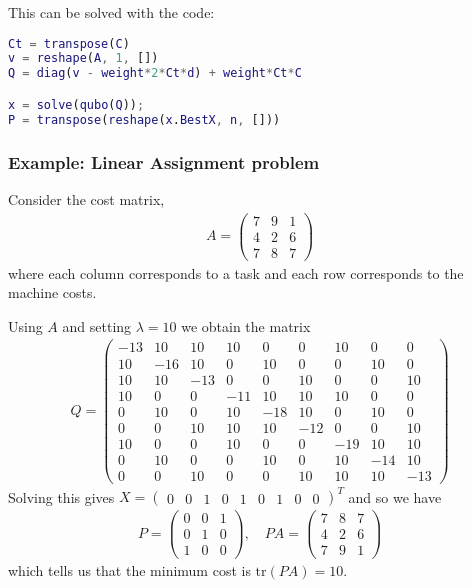 \documentclass{article}
\begin{document}
\noindent This can be solved with the code:
\begin{mdframed}[backgroundcolor=gray!12]
\begin{lstlisting}[language=MATLAB]
Ct = transpose(C)
v = reshape(A, 1, [])
Q = diag(v - weight*2*Ct*d) + weight*Ct*C

x = solve(qubo(Q));
P = transpose(reshape(x.BestX, n, []))
\end{lstlisting}
\end{mdframed}

\subsubsection{Example: Linear Assignment problem}

Consider the cost matrix, \begin{align*}
    A = \begin{pmatrix}
        7 & 9 & 1\\
        4 & 2 & 6\\
        7 & 8 & 7
    \end{pmatrix}
\end{align*}
where each column corresponds to a task and each row corresponds to the machine costs.

\noindent Using \(A\) and setting \(\lambda = 10\) we obtain the matrix
\begin{align*}
    Q = \begin{pmatrix}
        -13 & 10 & 10 & 10 & 0 & 0 & 10 & 0 & 0 \\
        10 & -16 & 10 & 0 & 10 & 0 & 0 & 10 & 0 \\
        10 & 10 & -13 & 0 & 0 & 10 & 0 & 0 & 10 \\
        10 & 0 & 0 & -11 & 10 & 10 & 10 & 0 & 0 \\
        0 & 10 & 0 & 10 & -18 & 10 & 0 & 10 & 0 \\
        0 & 0 & 10 & 10 & 10 & -12 & 0 & 0 & 10 \\
        10 & 0 & 0 & 10 & 0 & 0 & -19 & 10 & 10 \\
        0 & 10 & 0 & 0 & 10 & 0 & 10 & -14 & 10 \\
        0 & 0 & 10 & 0 & 0 & 10 & 10 & 10 & -13
    \end{pmatrix}
\end{align*}
Solving this gives \(X = \begin{pmatrix}
    0 & 0 & 1 & 0 & 1 & 0 & 1 & 0 & 0
\end{pmatrix}^T\)
and so we have \begin{align*}
    P = \begin{pmatrix}
        0 & 0 & 1 \\
        0 & 1 & 0 \\
        1 & 0 & 0
    \end{pmatrix}, \quad PA = \begin{pmatrix}
        7 & 8 & 7 \\
        4 & 2 & 6 \\
        7 & 9 & 1
    \end{pmatrix}
\end{align*}
which tells us that the minimum cost is \(\text{tr}(PA) = 10\).
\end{document}
